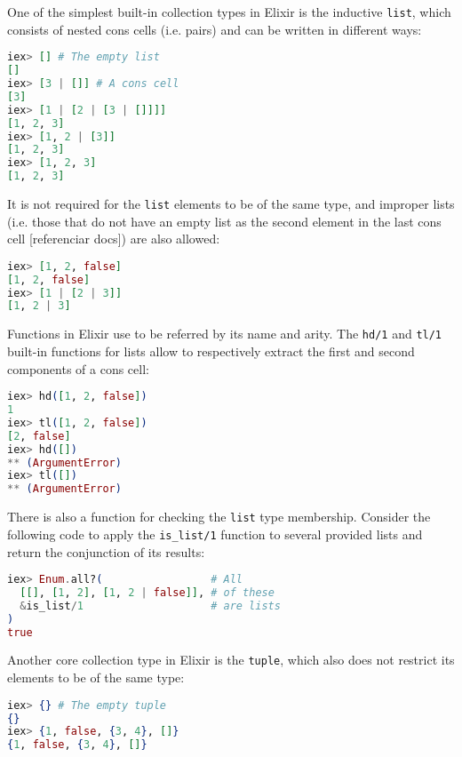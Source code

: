 One of the simplest built-in collection types in Elixir is the inductive 
\verb|list|, which consists of nested cons cells (i.e. pairs) and can be
written in different ways:

\begin{lstlisting}[language=elixir,numbers=none,frame=none]
iex> [] # The empty list 
[] 
iex> [3 | []] # A cons cell
[3]
iex> [1 | [2 | [3 | []]]]
[1, 2, 3]
iex> [1, 2 | [3]]
[1, 2, 3]
iex> [1, 2, 3]
[1, 2, 3]
\end{lstlisting}

It is not required for the \verb|list| elements to be of the same type, and
improper lists (i.e. those that do not have an empty list as the second element
in the last cons cell [referenciar docs]) are also allowed:

\begin{lstlisting}[language=elixir,numbers=none,frame=none]
iex> [1, 2, false]
[1, 2, false]
iex> [1 | [2 | 3]] 
[1, 2 | 3]
\end{lstlisting}

Functions in Elixir use to be referred by its name and arity. The \verb|hd/1|
and \verb|tl/1| built-in functions for lists allow to respectively extract the
first and second components of a cons cell:

\begin{lstlisting}[language=elixir,numbers=none,frame=none]
iex> hd([1, 2, false])
1
iex> tl([1, 2, false])
[2, false]
iex> hd([])
** (ArgumentError)
iex> tl([])
** (ArgumentError)
\end{lstlisting}

There is also a function for checking the \verb|list| type membership. Consider
the following code to apply the \verb|is_list/1| function to several provided 
lists and return the conjunction of its results:

\begin{lstlisting}[language=elixir,numbers=none,frame=none]
iex> Enum.all?(                 # All
  [[], [1, 2], [1, 2 | false]], # of these
  &is_list/1                    # are lists
)
true
\end{lstlisting}

Another core collection type in Elixir is the \verb|tuple|, which also does not
restrict its elements to be of the same type:

\begin{lstlisting}[language=elixir,numbers=none,frame=none]
iex> {} # The empty tuple
{}
iex> {1, false, {3, 4}, []}
{1, false, {3, 4}, []}
\end{lstlisting}

